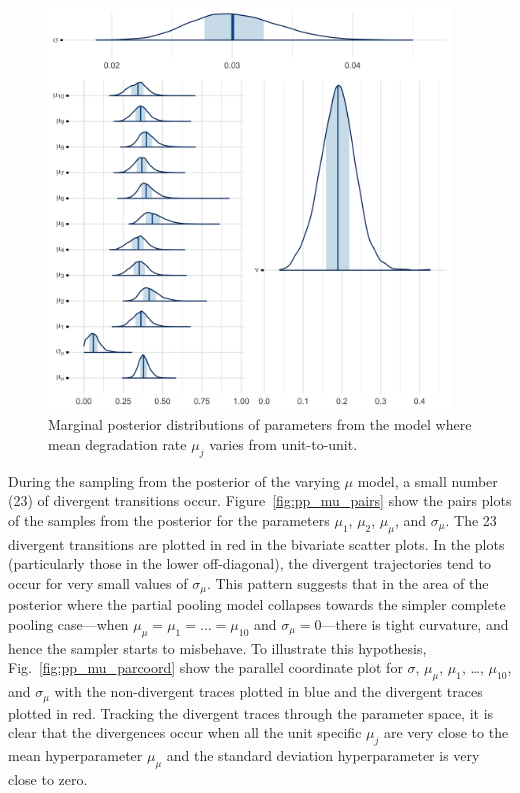 \begin{figure}[tbp]
   \centering
   \includegraphics[width=0.95\textwidth]{./figures/ch-5/plot-pp-mu-marg-post-1.png}
   \caption{Marginal posterior distributions of parameters from the model where mean degradation rate $\mu_j$ varies from unit-to-unit.}
   \label{fig:pp_mu_marg} 
\end{figure}

During the sampling from the posterior of the varying $\mu$ model, a small number (23) of divergent transitions occur. Figure~\ref{fig:pp_mu_pairs} show the pairs plots of the samples from the posterior for the parameters $\mu_1$, $\mu_2$, $\mu_\mu$, and $\sigma_\mu$. The 23 divergent transitions are plotted in red in the bivariate scatter plots. In the plots (particularly those in the lower off-diagonal), the divergent trajectories tend to occur for very small values of $\sigma_\mu$. This pattern suggests that in the area of the posterior where the partial pooling model collapses towards the simpler complete pooling case---when $\mu_\mu = \mu_1 = \ldots = \mu_{10}$ and $\sigma_\mu = 0$---there is tight curvature, and hence the sampler starts to misbehave. To illustrate this hypothesis, Fig.~\ref{fig:pp_mu_parcoord} show the parallel coordinate plot for $\sigma$, $\mu_\mu$, $\mu_1$, \ldots, $\mu_{10}$, and $\sigma_\mu$ with the non-divergent traces plotted in blue and the divergent traces plotted in red. Tracking the divergent traces through the parameter space, it is clear that the divergences occur when all the unit specific $\mu_j$ are very close to the mean hyperparameter $\mu_\mu$ and the standard deviation hyperparameter is very close to zero.

